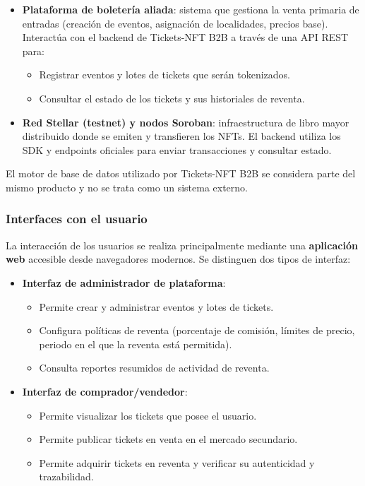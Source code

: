 \documentclass[12pt,letterpaper]{article}
\begin{document}
\begin{itemize}
    \item \textbf{Plataforma de boletería aliada}: sistema que gestiona la
          venta primaria de entradas (creación de eventos, asignación de
          localidades, precios base). Interactúa con el backend de
          Tickets-NFT B2B a través de una API REST para:
          \begin{itemize}
              \item Registrar eventos y lotes de tickets que serán tokenizados.
              \item Consultar el estado de los tickets y sus historiales de
                    reventa.
          \end{itemize}
    \item \textbf{Red Stellar (testnet) y nodos Soroban}: infraestructura de
          libro mayor distribuido donde se emiten y transfieren los NFTs. El
          backend utiliza los SDK y endpoints oficiales para enviar
          transacciones y consultar estado.
\end{itemize}

El motor de base de datos utilizado por Tickets-NFT B2B se considera parte del
mismo producto y no se trata como un sistema externo.

\subsubsection{Interfaces con el usuario}

La interacción de los usuarios se realiza principalmente mediante una
\textbf{aplicación web} accesible desde navegadores modernos. Se distinguen
dos tipos de interfaz:

\begin{itemize}
    \item \textbf{Interfaz de administrador de plataforma}:
          \begin{itemize}
              \item Permite crear y administrar eventos y lotes de tickets.
              \item Configura políticas de reventa (porcentaje de comisión,
                    límites de precio, periodo en el que la reventa está
                    permitida).
              \item Consulta reportes resumidos de actividad de reventa.
          \end{itemize}
    \item \textbf{Interfaz de comprador/vendedor}:
          \begin{itemize}
              \item Permite visualizar los tickets que posee el usuario.
              \item Permite publicar tickets en venta en el mercado secundario.
              \item Permite adquirir tickets en reventa y verificar su
                    autenticidad y trazabilidad.
          \end{itemize}
\end{itemize}
\end{document}
